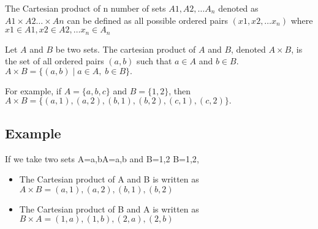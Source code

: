 \documentclass[12pt]{article}
\begin{document}
The Cartesian product of n number of sets $A1,A2,\ldots A_n$ denoted as $A1\times A2 \ldots \times An$ can be defined as all possible ordered pairs $(x1,x2,\ldots x_n)$
where $x1\in A1,x2\in A2,\ldots x_n \in A_n$

 Let $ A$ and $ B$ be two sets. The cartesian product of $ A$ and $ B$, denoted  $ A \times B$, is the set of all ordered pairs $ (a,b)$ such that $ a \in A$ and $ b \in B$.
$\displaystyle A \times B = \{ (a,b) \; \vert \; a \in A, \; b \in B \}.$	   

For example, if  $ A=\{ a,b,c \}$ and  $ B= \{ 1,2 \}$, then
$\displaystyle A \times B = \{ (a,1), (a,2), (b,1), (b,2), (c,1), (c,2) \}.$

\subsection{Example}
If we take two sets A={a,b}A={a,b} and B={1,2}
B={1,2},

\begin{itemize}

\item The Cartesian product of A and B is written 
as  $A \times B={(a,1),(a,2),(b,1),(b,2)}$
\item The Cartesian product of B and A is written as  
$B\times A={(1,a),(1,b),(2,a),(2,b)}$
\end{itemize}
\end{document}
